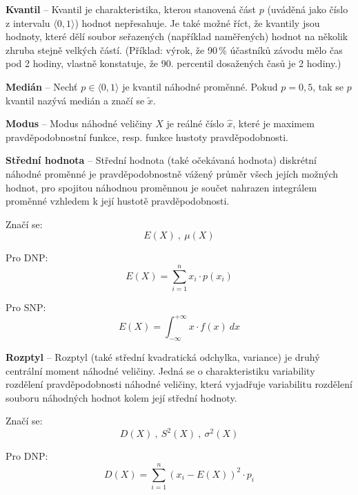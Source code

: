 \begin{compactitem}

    \item \textbf{Kvantil} -- Kvantil je charakteristika, kterou stanovená část $p$ (uváděná jako číslo z intervalu $\langle 0, 1\rangle$) hodnot nepřesahuje. Je také možné říct, že kvantily jsou hodnoty, které dělí soubor seřazených (například naměřených) hodnot na několik zhruba stejně velkých částí. (Příklad: výrok, že 90\,\% účastníků závodu mělo čas pod 2 hodiny, vlastně konstatuje, že 90. percentil dosažených časů je 2 hodiny.)

    \item \textbf{Medián} -- Nechť $p \in \langle 0, 1\rangle$ je kvantil náhodné proměnné. Pokud $p = 0,5$, tak se $p$ kvantil nazývá medián a značí se $\tilde{x}$.

    \item \textbf{Modus} -- Modus náhodné veličiny $X$ je reálné číslo $\hat{x}$, které je maximem pravděpodobnostní funkce, resp. funkce hustoty pravděpodobnosti.

    \item \textbf{Střední hodnota} -- Střední hodnota (také očekávaná hodnota) diskrétní náhodné proměnné je pravděpodobnostně vážený průměr všech jejích možných hodnot, pro spojitou náhodnou proměnnou je součet nahrazen integrálem proměnné vzhledem k její hustotě pravděpodobnosti. \begin{compactitem}
        \item Značí se:
        $$ E(X) ~,~ \mu(X) $$

        \item Pro DNP:
        $$ E(X) = \sum_{i = 1}^n x_i \cdot p(x_i) $$

        \item Pro SNP:
        $$ E(X) = \int_{- \infty}^{+ \infty} x \cdot f(x) ~ dx $$
    \end{compactitem}

    \item \textbf{Rozptyl} -- Rozptyl (také střední kvadratická odchylka, variance) je druhý centrální moment náhodné veličiny. Jedná se o charakteristiku variability rozdělení pravděpodobnosti náhodné veličiny, která vyjadřuje variabilitu rozdělení souboru náhodných hodnot kolem její střední hodnoty. \begin{compactitem}
        \item Značí se:
        $$ D(X) ~,~ S^2(X) ~,~ \sigma^2(X) $$

        \item Pro DNP:
        $$ D(X) = \sum_{i=1}^n {\left(x_i - E(X)\right)}^2 \cdot p_i $$


\end{compactitem}
\end{compactitem}
